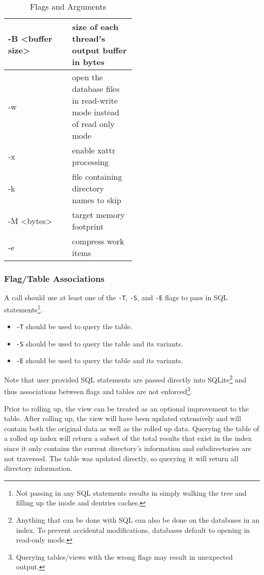 \begin{table}[H]
\begin{tabular*}{\linewidth}{l|p{0.5\linewidth}}
    \hline
    -B \textless buffer size\textgreater & size of each thread's output buffer in bytes \\
    \hline
    -w & open the database files in read-write mode instead of read only mode \\
    \hline
    -x & enable xattr processing \\
    \hline
    -k & file containing directory names to skip \\
    \hline
    -M \textless bytes\textgreater & target memory footprint \\
    \hline
    -e & compress work items \\
    \hline
  \end{tabular*}
  \caption{\label{tab:widgets} \gufiquery Flags and Arguments}
\end{table}

\subsubsection{Flag/Table Associations}
A \gufiquery call should use at least one of the \texttt{-T},
\texttt{-S}, and \texttt{-E} flags to pass in SQL
statements\footnote{Not passing in any SQL statements results in
  \gufiquery simply walking the tree and filling up the inode and
  dentries caches.}.

\begin{itemize}
\item \texttt{-T} should be used to query the \treesummary table.
\item \texttt{-S} should be used to query the \summary table and its
  variants.
\item \texttt{-E} should be used to query the \entries table and its
  variants.
\end{itemize}

Note that user provided SQL statements are passed directly into
SQLite\footnote{Anything that can be done with SQL can also be done on
  the databases in an index. To prevent accidental modifications,
  databases default to opening in read-only mode.} and thus
associations between flags and tables are not
enforced\footnote{Querying tables/views with the wrong flags may
  result in unexpected output.}.

Prior to rolling up, the \pentries view can be treated as an optional
improvement to the \entries table. After rolling up, the \pentries
view will have been updated extensively and will contain both the
original \entries data as well as the rolled up data. Querying the
\entries table of a rolled up index will return a subset of the total
results that exist in the index since it only contains the current
directory's information and subdirectories are not traversed. The
\summary table was updated directly, so querying it will return all
directory information.


